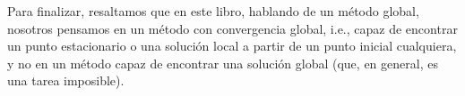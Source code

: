 Para finalizar, resaltamos que en este libro, hablando de un método global, nosotros pensamos en un método con convergencia global, i.e., capaz de encontrar un punto estacionario o una solución local a partir de un punto inicial cualquiera, y no en un método capaz de encontrar una solución global (que, en general, es una tarea imposible).
